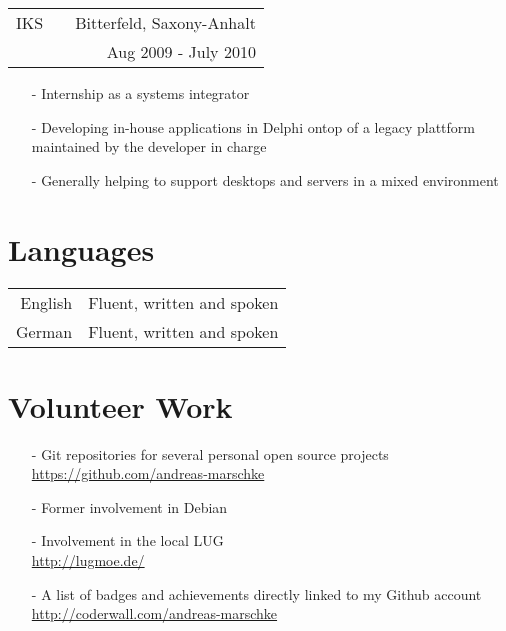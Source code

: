 \documentclass[11pt]{article}
\begin{document}
\pagebreak

\begin{tabular}{@{ } l @{} p{7.45cm} @{} r @{ }}
  IKS & & Bitterfeld, Saxony-Anhalt \\
  & & Aug 2009 - July 2010 \\
\end{tabular}

\begin{itemize}
  \item[-] Internship as a systems integrator
  \item[-] Developing in-house applications in Delphi ontop of a
    legacy plattform maintained by the developer in charge 
  \item[-] Generally helping to support desktops and servers in a
    mixed environment
\end{itemize}

\thispagestyle{empty}

\section*{Languages}

\begin{tabular}{@{} r @{ : } l @{}}
  English & Fluent, written and spoken \\
  German  & Fluent, written and spoken \\
\end{tabular}

\section*{Volunteer Work}
\begin{itemize}
  \item[-] Git repositories for several personal open source projects \\
    \url{https://github.com/andreas-marschke}
  \item[-] Former involvement in Debian
  \item[-] Involvement in the local LUG \\
    \url{http://lugmoe.de/}
  \item[-] A list of badges and achievements directly linked to my Github account \\
    \url{http://coderwall.com/andreas-marschke}

	
\end{itemize}

\pagestyle{empty}
\end{document}
